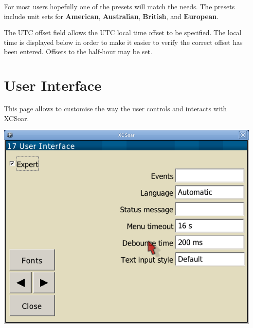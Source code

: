For most users hopefully one of the presets will match the needs.  The presets 
include unit sets for {\bf American}, {\bf Australian}, {\bf British}, 
and {\bf European}.

The UTC offset field allows the UTC local time offset to be specified.
The local time is displayed below in order to make it easier to verify
the correct offset has been entered.  Offsets to the half-hour may be
set.


\clearpage
\section{User Interface}\label{sec:interface}

This page allows to customise the way the user controls and interacts with
XCSoar.

\begin{center}
\includegraphics[angle=0,width=0.8\linewidth,keepaspectratio='true']{figures/config-interface.png}
\end{center}

